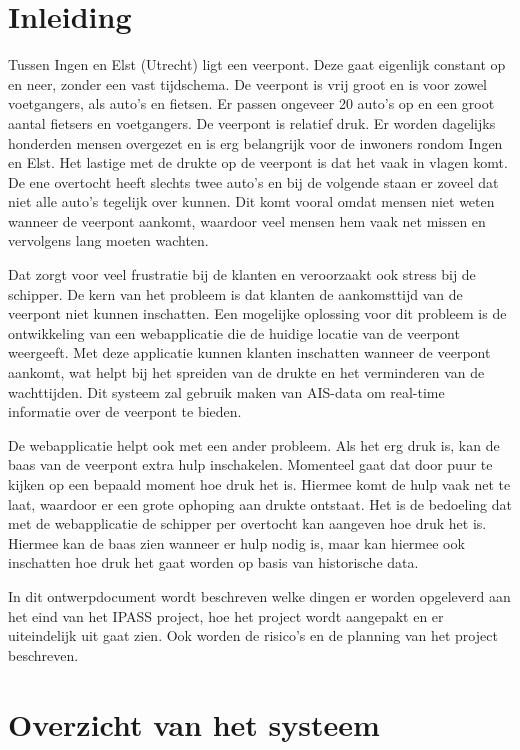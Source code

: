 \documentclass{article}
\begin{document}
\section{Inleiding}
Tussen Ingen en Elst (Utrecht) ligt een veerpont. Deze gaat eigenlijk constant op en neer, zonder een vast tijdschema.
De veerpont is vrij groot en is voor zowel voetgangers, als auto's en fietsen. Er passen ongeveer 20 auto's op en een groot aantal fietsers en voetgangers.
De veerpont is relatief druk. Er worden dagelijks honderden mensen overgezet en is erg belangrijk voor de inwoners rondom Ingen en Elst. Het lastige met de drukte op de veerpont is dat het vaak in vlagen komt. De ene overtocht heeft slechts twee auto's en bij de volgende staan er zoveel dat niet alle auto's tegelijk over kunnen. Dit komt vooral omdat mensen niet weten wanneer de veerpont aankomt, waardoor veel mensen hem vaak net missen en vervolgens lang moeten wachten.
\par\smallskip 
Dat zorgt voor veel frustratie bij de klanten en veroorzaakt ook stress bij de schipper.
De kern van het probleem is dat klanten de aankomsttijd van de veerpont niet kunnen inschatten.
Een mogelijke oplossing voor dit probleem is de ontwikkeling van een webapplicatie die de huidige locatie van de veerpont weergeeft. Met deze applicatie kunnen klanten inschatten wanneer de veerpont aankomt, wat helpt bij het spreiden van de drukte en het verminderen van de wachttijden. Dit systeem zal gebruik maken van AIS-data om real-time informatie over de veerpont te bieden.
\par\smallskip 
De webapplicatie helpt ook met een ander probleem. Als het erg druk is, kan de baas van de veerpont extra hulp inschakelen. Momenteel gaat dat door puur te kijken op een bepaald moment hoe druk het is. 
Hiermee komt de hulp vaak net te laat, waardoor er een grote ophoping aan drukte ontstaat. Het is de bedoeling dat met de webapplicatie de schipper per overtocht kan aangeven hoe druk het is. Hiermee kan de baas zien wanneer er hulp nodig is, maar kan hiermee ook inschatten hoe druk het gaat worden op basis van historische data. 
\par\smallskip 
In dit ontwerpdocument wordt beschreven welke dingen er worden opgeleverd aan het eind van het IPASS project, hoe het project wordt aangepakt en er uiteindelijk uit gaat zien.
Ook worden de risico's en de planning van het project beschreven.


\section{Overzicht van het systeem}
\end{document}
